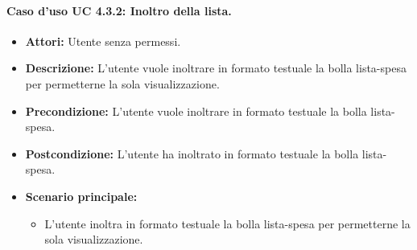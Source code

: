 \paragraph{Caso d'uso UC 4.3.2: Inoltro della lista.}
\label{Caso d'uso UC 4.3.2: Inoltro della lista.}

\FloatBarrier
\begin{itemize}
\item \textbf{Attori:} Utente senza permessi.
\item \textbf{Descrizione:} L'utente vuole inoltrare in formato testuale la bolla lista-spesa per permetterne la sola visualizzazione.
\item \textbf{Precondizione:} L'utente vuole inoltrare in formato testuale la bolla lista-spesa. 
\item \textbf{Postcondizione:} L'utente ha inoltrato in formato testuale la bolla lista-spesa.
\item \textbf{Scenario principale:}
	\begin{itemize}
	\item L'utente inoltra in formato testuale la bolla lista-spesa per permetterne la sola visualizzazione.
	\end{itemize}
\end{itemize}